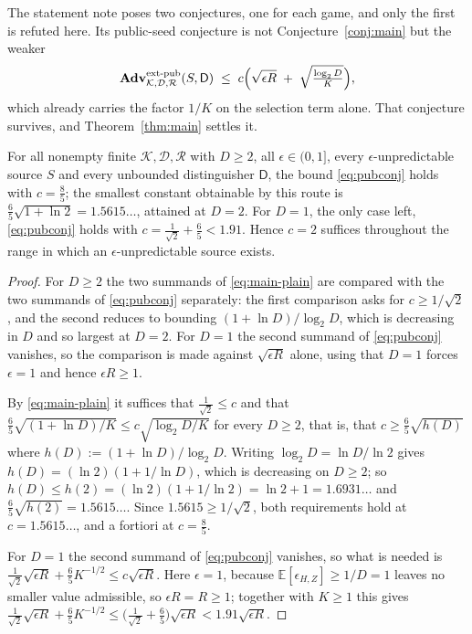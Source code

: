 \documentclass{conjura-solution}
\newcommand{\Adv}{\mathbf{Adv}}
\newcommand{\extp}{\mathrm{ext}\text{-}\mathrm{pub}}
\newcommand{\calK}{\mathcal{K}}
\newcommand{\calD}{\mathcal{D}}
\newcommand{\calR}{\mathcal{R}}
\theoremstyle{cjplain}
\begin{document}
The statement note poses two conjectures, one for each game, and only the first is refuted here.
Its public-seed conjecture is not Conjecture~\ref{conj:main} but the weaker
\begin{equation}\label{eq:pubconj}
  \Adv^{\extp}_{\calK,\calD,\calR}(S,\mathsf{D})
  \;\le\; c\Bigl(\sqrt{\epsilon R} \;+\; \sqrt{\tfrac{\log_2 D}{K}}\Bigr) ,
\end{equation}
which already carries the factor $1/K$ on the selection term alone. That conjecture survives, and
Theorem~\ref{thm:main} settles it.

\begin{corollary}\label{cor:pub}
For all nonempty finite $\calK, \calD, \calR$ with $D \ge 2$, all $\epsilon \in (0,1]$, every
$\epsilon$-unpredictable source $S$ and every unbounded distinguisher $\mathsf{D}$, the bound
\eqref{eq:pubconj} holds with $c = \tfrac85$; the smallest constant obtainable by this route is
$\tfrac65\sqrt{1 + \ln 2} = 1.5615\ldots$, attained at $D = 2$. For $D = 1$, the only case left,
\eqref{eq:pubconj} holds with $c = \tfrac{1}{\sqrt2} + \tfrac65 < 1.91$. Hence $c = 2$ suffices
throughout the range in which an $\epsilon$-unpredictable source exists.
\end{corollary}

\begin{proof}
For $D \ge 2$ the two summands of \eqref{eq:main-plain} are compared with the two summands of
\eqref{eq:pubconj} separately: the first comparison asks for $c \ge 1/\sqrt2$, and the second
reduces to bounding $(1+\ln D)/\log_2 D$, which is decreasing in $D$ and so largest at $D = 2$.
For $D = 1$ the second summand of \eqref{eq:pubconj} vanishes, so the comparison is made against
$\sqrt{\epsilon R}$ alone, using that $D = 1$ forces $\epsilon = 1$ and hence $\epsilon R \ge 1$.

By \eqref{eq:main-plain} it suffices that $\tfrac{1}{\sqrt2} \le c$ and that
$\tfrac65\sqrt{(1+\ln D)/K} \le c\sqrt{\log_2 D / K}$ for every $D \ge 2$, that is, that
$c \ge \tfrac65\sqrt{h(D)}$ where $h(D) := (1+\ln D)/\log_2 D$. Writing
$\log_2 D = \ln D/\ln 2$ gives $h(D) = (\ln 2)(1 + 1/\ln D)$, which is decreasing on $D \ge 2$;
so $h(D) \le h(2) = (\ln 2)(1 + 1/\ln 2) = \ln 2 + 1 = 1.6931\ldots$ and
$\tfrac65\sqrt{h(2)} = 1.5615\ldots$. Since $1.5615 \ge 1/\sqrt2$, both requirements hold at
$c = 1.5615\ldots$, and a fortiori at $c = \tfrac85$.

For $D = 1$ the second summand of \eqref{eq:pubconj} vanishes, so what is needed is
$\tfrac{1}{\sqrt2}\sqrt{\epsilon R} + \tfrac65 K^{-1/2} \le c\sqrt{\epsilon R}$. Here $\epsilon = 1$,
because $\mathbb{E}[\epsilon_{H,Z}] \ge 1/D = 1$ leaves no smaller value admissible, so
$\epsilon R = R \ge 1$; together with $K \ge 1$ this gives
$\tfrac{1}{\sqrt2}\sqrt{\epsilon R} + \tfrac65 K^{-1/2} \le
\bigl(\tfrac{1}{\sqrt2} + \tfrac65\bigr)\sqrt{\epsilon R} < 1.91\sqrt{\epsilon R}$.
\end{proof}
\end{document}
